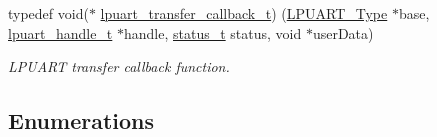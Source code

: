 \begin{DoxyCompactItemize}
typedef void($\ast$ \mbox{\hyperlink{group__lpuart__driver_ga558e0c23c05831e446708a3935f36332}{lpuart\+\_\+transfer\+\_\+callback\+\_\+t}}) (\mbox{\hyperlink{struct_l_p_u_a_r_t___type}{L\+P\+U\+A\+R\+T\+\_\+\+Type}} $\ast$base, \mbox{\hyperlink{struct__lpuart__handle}{lpuart\+\_\+handle\+\_\+t}} $\ast$handle, \mbox{\hyperlink{group__ksdk__common_gaaabdaf7ee58ca7269bd4bf24efcde092}{status\+\_\+t}} status, void $\ast$user\+Data)
\begin{DoxyCompactList}\small\item\em L\+P\+U\+A\+RT transfer callback function. \end{DoxyCompactList}\end{DoxyCompactItemize}
\subsection*{Enumerations}
